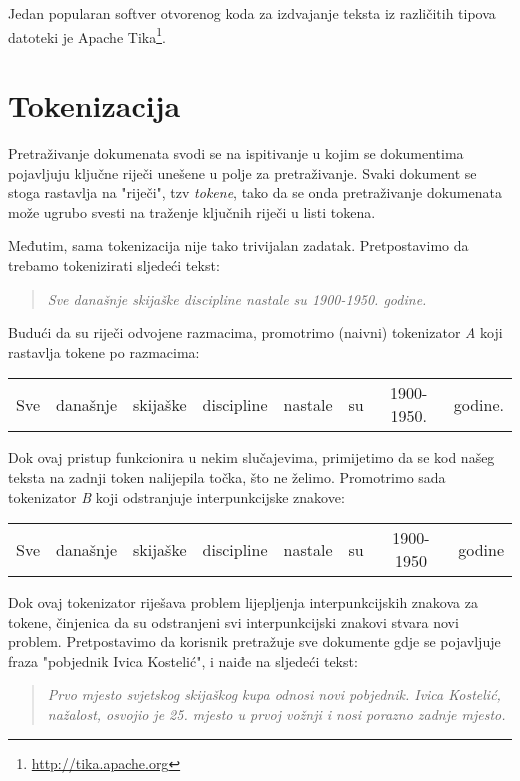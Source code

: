 \documentclass[11pt]{scrreprt}
\begin{document}
Jedan popularan softver otvorenog koda za izdvajanje teksta iz različitih tipova datoteki je Apache Tika\footnote{\url{http://tika.apache.org}}.

\section{Tokenizacija}

Pretraživanje dokumenata svodi se na ispitivanje u kojim se dokumentima pojavljuju ključne riječi unešene u polje za pretraživanje. Svaki dokument se stoga rastavlja na "riječi", tzv \textit{tokene}, tako da se onda pretraživanje dokumenata može ugrubo svesti na traženje ključnih riječi u listi tokena.

Međutim, sama tokenizacija nije tako trivijalan zadatak. Pretpostavimo da trebamo tokenizirati sljedeći tekst:

\begin{quote}
  \textit{Sve današnje skijaške discipline nastale su 1900-1950. godine.}
\end{quote}

Budući da su riječi odvojene razmacima, promotrimo (naivni) tokenizator \textit{A} koji rastavlja tokene po razmacima:

\begin{center}
  \begin{tabular}{cccccccc}
    Sve & današnje & skijaške & discipline & nastale & su & 1900-1950. & godine.
  \end{tabular}
\end{center}

Dok ovaj pristup funkcionira u nekim slučajevima, primijetimo da se kod našeg teksta na zadnji token nalijepila točka, što ne želimo. Promotrimo sada tokenizator \textit{B} koji odstranjuje interpunkcijske znakove:

\begin{center}
  \begin{tabular}{cccccccc}
    Sve & današnje & skijaške & discipline & nastale & su & 1900-1950 & godine
  \end{tabular}
\end{center}

Dok ovaj tokenizator riješava problem lijepljenja interpunkcijskih znakova za tokene, činjenica da su odstranjeni svi interpunkcijski znakovi stvara novi problem. Pretpostavimo da korisnik pretražuje sve dokumente gdje se pojavljuje fraza "pobjednik Ivica Kostelić", i naiđe na sljedeći tekst:

\begin{quote}
  \textit{Prvo mjesto svjetskog skijaškog kupa odnosi novi pobjednik. Ivica Kostelić, nažalost, osvojio je 25. mjesto u prvoj vožnji i nosi porazno zadnje mjesto.}
\end{quote}
\end{document}
